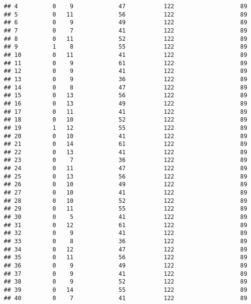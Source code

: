 \documentclass[]{article}
\begin{document}
\begin{verbatim}
## 4          0    9             47           122                   89
## 5          0   11             56           122                   89
## 6          0    9             49           122                   89
## 7          0    7             41           122                   89
## 8          0   11             52           122                   89
## 9          1    8             55           122                   89
## 10         0   11             41           122                   89
## 11         0    9             61           122                   89
## 12         0    9             41           122                   89
## 13         0    9             36           122                   89
## 14         0    8             47           122                   89
## 15         0   13             56           122                   89
## 16         0   13             49           122                   89
## 17         0   11             41           122                   89
## 18         0   10             52           122                   89
## 19         1   12             55           122                   89
## 20         0   10             41           122                   89
## 21         0   14             61           122                   89
## 22         0   13             41           122                   89
## 23         0    7             36           122                   89
## 24         0   11             47           122                   89
## 25         0   13             56           122                   89
## 26         0   10             49           122                   89
## 27         0   10             41           122                   89
## 28         0   10             52           122                   89
## 29         0   11             55           122                   89
## 30         0    5             41           122                   89
## 31         0   12             61           122                   89
## 32         0    9             41           122                   89
## 33         0    8             36           122                   89
## 34         0   12             47           122                   89
## 35         0   11             56           122                   89
## 36         0    9             49           122                   89
## 37         0    9             41           122                   89
## 38         0    9             52           122                   89
## 39         0   14             55           122                   89
## 40         0    7             41           122                   89

\end{verbatim}
\end{document}
